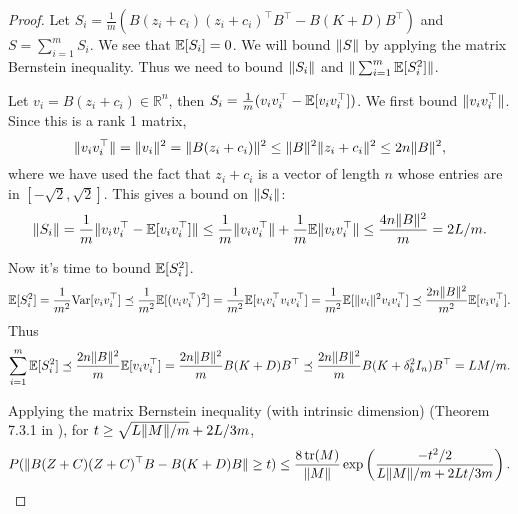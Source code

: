 \begin{proof}
  Let $S_i = \frac{1}{m} \left( B (z_i + c_i) (z_i + c_i)^\top B^\top - B (K + D)B^\top
  \right)$ and $S = \sum_{i=1}^{m} S_i$.
  We see that $\mathbb{E}[S_i] = 0$.
  We will bound $\|S\|$ by applying the matrix Bernstein inequality.
  Thus we need to bound $\|S_i\|$ and $\|\sum_{i=1}^{m} \mathbb{E}[S_i^2]\|$.

  Let $v_i = B(z_i + c_i) \in \mathbb{R}^{n}$, then $S_i = \frac{1}{m} (v_i
  v_i^\top  - \mathbb{E}[v_i v_i^\top])$.
  We first bound $\|v_i v_i^\top\|$.
  Since this is a rank 1 matrix,
  \begin{equation*}
    \|v_i v_i^\top\| = \|v_i\|^2 = \|B(z_i + c_i)\|^2 \leq \|B\|^2
    \|z_i + c_i\|^2 \leq 2n \|B\|^2,
  \end{equation*}
  where we have used the fact that $z_i + c_i$ is a vector of length $n$ whose
  entries are in $[-\sqrt{2}, \sqrt{2}]$.
  This gives a bound on $\|S_i\|$:
  \begin{equation*}
    \|S_i\| = \frac{1}{m} \|v_i v_i^\top - \mathbb{E}[v_i v_i^\top]\|
    \leq \frac{1}{m} \|v_i v_i^\top\| + \frac{1}{m} \mathbb{E} \|v_i v_i^\top\|
    \leq \frac{4n \|B\|^2}{m} = 2L/m.
  \end{equation*}

  Now it's time to bound $\mathbb{E}[S_i^2]$.
  \begin{equation*}
    \mathbb{E}[S_i^2] = \frac{1}{m^2} {\rm Var}[v_i v_i^\top] \preceq \frac{1}{m^2} \mathbb{E}[(v_i v_i^\top)^2]
    = \frac{1}{m^2} \mathbb{E}[v_i v_i^\top v_i v_i^\top] = \frac{1}{m^2} \mathbb{E}[\|v_i\|^2 v_i
    v_i^\top] \preceq \frac{2n \|B\|^2}{m^2} \mathbb{E}[v_i v_i^\top].
  \end{equation*}
  Thus
  \begin{equation*}
    \sum_{i=1}^{m} \mathbb{E}[S_i^2] \preceq \frac{2n \|B\|^2}{m} \mathbb{E}[v_i v_i^\top] = \frac{2n
      \|B\|^2}{m} B(K + D) B^\top \preceq \frac{2n \|B\|^2}{m} B(K + \delta^2_b I_n)B^\top
    = LM/m.
  \end{equation*}

  Applying the matrix Bernstein inequality (with intrinsic dimension) (Theorem
  7.3.1 in \cite{tropp2015introduction}), for $t \geq \sqrt{L \|M\|/m} + 2L/3m$,
  \begin{equation*}
    P(\|B(Z + C)(Z + C)^\top B - B(K + D)B\| \geq t) \leq \frac{8\mathop{\rm tr}(M)}{\|M\|}
    \exp \left( \frac{-t^2/2}{L \|M\|/m + 2Lt/3m} \right).
  \end{equation*}
\end{proof}

